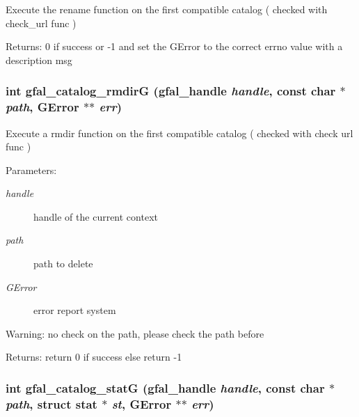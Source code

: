 Execute the rename function on the first compatible catalog ( checked with check\_\-url func ) \begin{Desc}
\item[Returns:]0 if success or -1 and set the GError to the correct errno value with a description msg \end{Desc}
\subsubsection{\setlength{\rightskip}{0pt plus 5cm}int gfal\_\-catalog\_\-rmdir\-G (gfal\_\-handle {\em handle}, const char $\ast$ {\em path}, GError $\ast$$\ast$ {\em err})}\label{gfal__common__catalog_8c_9cd4da87728df80003fe8618c4f63e13}


Execute a rmdir function on the first compatible catalog ( checked with check url func ) \begin{Desc}
\item[Parameters:]
\begin{description}
\item[{\em handle}]handle of the current context \item[{\em path}]path to delete \item[{\em GError}]error report system \end{description}
\end{Desc}
\begin{Desc}
\item[Warning:]no check on the path, please check the path before \end{Desc}
\begin{Desc}
\item[Returns:]return 0 if success else return -1 \end{Desc}
\subsubsection{\setlength{\rightskip}{0pt plus 5cm}int gfal\_\-catalog\_\-stat\-G (gfal\_\-handle {\em handle}, const char $\ast$ {\em path}, struct stat $\ast$ {\em st}, GError $\ast$$\ast$ {\em err})}\label{gfal__common__catalog_8c_28ca68c00e4a67bc158975ef3e4f8013}


